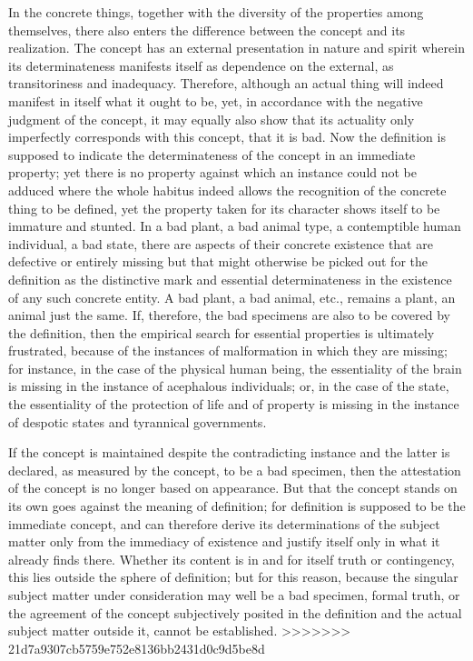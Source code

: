 In the concrete things, together with
the diversity of the properties among themselves,
there also enters the difference between
the concept and its realization.
The concept has an external presentation
in nature and spirit
wherein its determinateness manifests itself
as dependence on the external,
as transitoriness and inadequacy.
Therefore, although an actual thing
will indeed manifest in itself
what it ought to be, yet,
in accordance with the negative judgment of the concept,
it may equally also show that its actuality
only imperfectly corresponds with this concept,
that it is bad.
Now the definition is supposed to
indicate the determinateness of
the concept in an immediate property;
yet there is no property against which
an instance could not be adduced
where the whole habitus indeed allows
the recognition of the concrete thing to be defined,
yet the property taken for its character shows itself
to be immature and stunted.
In a bad plant, a bad animal type,
a contemptible human individual, a bad state,
there are aspects of their concrete existence
that are defective or entirely missing
but that might otherwise be picked out
for the definition as the distinctive mark
and essential determinateness
in the existence of any such concrete entity.
A bad plant, a bad animal, etc., remains a plant,
an animal just the same.
If, therefore, the bad specimens are
also to be covered by the definition,
then the empirical search for essential properties is
ultimately frustrated,
because of the instances of malformation
in which they are missing;
for instance, in the case of the physical human being,
the essentiality of the brain is missing
in the instance of acephalous individuals;
or, in the case of the state, the essentiality of
the protection of life and of property is
missing in the instance of despotic states
and tyrannical governments.

If the concept is maintained despite
the contradicting instance
and the latter is declared,
as measured by the concept,
to be a bad specimen,
then the attestation of the concept is
no longer based on appearance.
But that the concept stands on its own
goes against the meaning of definition;
for definition is supposed to be the immediate concept,
and can therefore derive its determinations of
the subject matter only from the immediacy of existence
and justify itself only in what it already finds there.
Whether its content is in and for itself truth or contingency,
this lies outside the sphere of definition;
but for this reason, because the singular
subject matter under consideration
may well be a bad specimen,
formal truth, or the agreement of the concept
subjectively posited in the definition
and the actual subject matter outside it,
cannot be established.
>>>>>>> 21d7a9307cb5759e752e8136bb2431d0c9d5be8d

